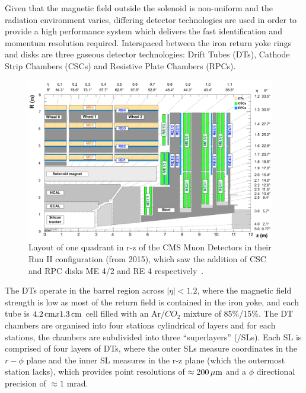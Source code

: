 Given that the magnetic field outside the solenoid is non-uniform and the radiation environment varies, differing detector technologies are used in order to provide a high performance system which delivers the fast identification and momentum resolution required. 
Interspaced between the iron return yoke rings and disks are three gaseous detector technologies: Drift Tubes (DTs), Cathode Strip Chambers (CSCs) and Resistive Plate Chambers (RPCs).

\begin{figure}[htbp]
\begin{center}
\includegraphics[width=0.97\textwidth]{figs/cms/cms_muon_quadrant_run_ii.pdf}
\caption{Layout of one quadrant in r-z of the CMS Muon Detectors in their Run II configuration (from 2015), which saw the addition of CSC and RPC disks ME 4/2 and RE 4 respectively~\cite{CMS-DP-2016-046}.}
\label{fig:muonChambers}
\end{center}
\end{figure}

The DTs operate in the barrel region across $|\eta| < 1.2$, where the magnetic field strength is low as most of the return field is contained in the iron yoke,	and each tube is $4.2\,\text{cm} x 1.3\,\text{cm}$ cell filled with an Ar/$CO_{2}$ mixture of 85\%/15\%.
The DT chambers are organised into four stations cylindrical of layers and for each stations, the chambers are subdivided into three ``superlayers'' (/SLs).
Each SL is comprised of four layers of DTs, where the outer SLs measure coordinates in the $r-\phi$ plane and the inner SL measures in the r-z plane (which the outermost station lacks), which provides point resolutions of $\approx 200\,\mu\text{m}$ and a $\phi$ directional precision of $\approx 1$ mrad.

